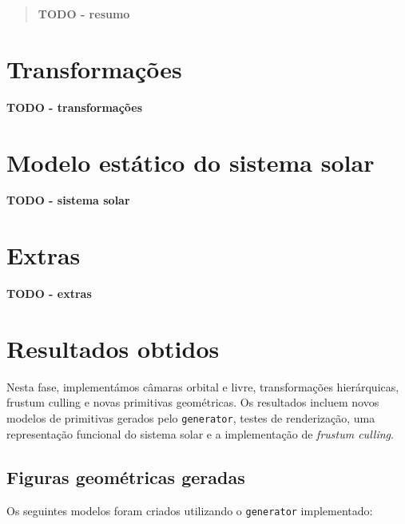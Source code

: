 \documentclass[12pt, a4paper]{article}
\begin{document}
\pagebreak

\begin{abstract}
    \textbf{\color{red} TODO - resumo}
\end{abstract}

\section{Transformações}

\textbf{\color{red} TODO - transformações}

\section{Modelo estático do sistema solar}

\textbf{\color{red} TODO - sistema solar}

\section{Extras}

\textbf{\color{red} TODO - extras}

\section{Resultados obtidos}

Nesta fase, implementámos câmaras orbital e livre, transformações hierárquicas, frustum culling e
novas primitivas geométricas. Os resultados incluem novos modelos de primitivas gerados pelo
\texttt{generator}, testes de renderização, uma representação funcional do sistema solar e a
implementação de \textit{frustum culling}.

\subsection{Figuras geométricas geradas}

Os seguintes modelos foram criados utilizando o \texttt{generator} implementado:
\end{document}
